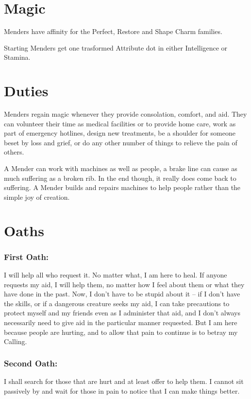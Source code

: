 \section*{Magic}

Menders have affinity for the Perfect, Restore and Shape Charm families.

Starting Menders get one trasformed Attribute dot in either Intelligence or Stamina. 

\section*{Duties}

Menders regain magic whenever they provide consolation, comfort, and aid. They can volunteer their time as medical facilities or to provide home care, work as part of emergency hotlines, design new treatments, be a shoulder for someone beset by loss and grief, or do any other number of things to relieve the pain of others. 

A Mender can work with machines as well as people, a brake line can cause as much suffering as a broken rib. In the end though, it really does come back to suffering. A Mender builds and repairs machines to help people rather than the simple joy of creation. 

\section*{Oaths}
\subsubsection*{First Oath:} I will help all who request it. No matter what, I am here to heal. If anyone requests my aid, I will help them, no matter how I feel about them or what they have done in the past. Now, I don't have to be stupid about it -- if I don't have the skills, or if a dangerous creature seeks my aid, I can take precautions to protect myself and my friends even as I administer that aid, and I don't always necessarily need to give aid in the particular manner requested. But I am here because people are hurting, and to allow that pain to continue is to betray my Calling.

\subsubsection*{Second Oath:} I shall search for those that are hurt and at least offer to help them. I cannot sit passively by and wait for those in pain to notice that I can make things better.

